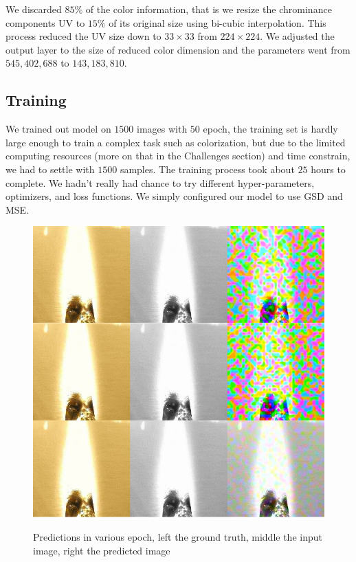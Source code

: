 \documentclass[12pt]{article}
\begin{document}
We discarded $85\%$ of the color information, that is we resize the chrominance components UV to $15\%$ of its original size using bi-cubic interpolation. This process reduced the UV size down to $33\times33$ from $224\times224$. We adjusted the output layer to the size of reduced color dimension and the parameters went from $545,402,688$ to $143,183,810$. 


\subsection{Training}
We trained out model on $1500$ images with $50$ epoch, the training set is hardly large enough to train a complex task such as colorization, but due to the limited computing resources (more on that in the Challenges section) and time constrain, we had to settle with $1500$ samples. The training process took about $25$ hours to complete. We hadn't really had chance to try different hyper-parameters, optimizers, and loss functions. We simply configured our model to use GSD and MSE. 



\begin{figure}[H]
 \centering
  \includegraphics[width=5.0in]{resource/trainstage.png}
 \label{yuvimage}
 \caption{Predictions in various epoch, left the ground truth, middle the input image, right the predicted image}
\end{figure}
\end{document}
